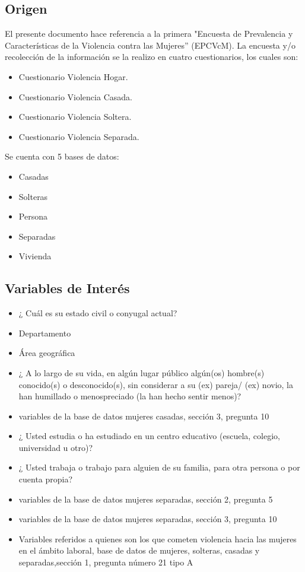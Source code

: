 \documentclass[11pt,letter]{article}
\begin{document}
\subsection{Origen}
El presente documento hace referencia a la primera "Encuesta de Prevalencia y Características de la Violencia contra las Mujeres'' (EPCVcM).
La encuesta y/o recolección de la información se la realizo en cuatro cuestionarios, los cuales son:
\begin{itemize}
\item	Cuestionario Violencia Hogar.
\item   Cuestionario Violencia Casada.
\item   Cuestionario Violencia Soltera.
\item   Cuestionario Violencia Separada.
\end{itemize}
Se cuenta con 5 bases de datos:
\begin{itemize}
\item	Casadas
\item	Solteras
\item	Persona
\item	Separadas
\item	Vivienda
\end{itemize}

\subsection{Variables de Interés}
\begin{itemize}
\item ¿ Cuál es su estado civil o conyugal actual?
\item Departamento
\item Área geográfica
\item ¿ A lo largo de su vida, en algún lugar público algún(os) hombre(s) conocido(s) o desconocido(s), sin considerar a su (ex) pareja/ (ex) novio, la han humillado o menospreciado (la han hecho sentir menos)?
\item variables de la base de datos mujeres casadas, sección 3, pregunta 10
\item ¿ Usted estudia o ha estudiado en un centro educativo (escuela, colegio, universidad u otro)?
\item ¿ Usted trabaja o trabajo para alguien de su familia, para otra persona o por cuenta propia?
\item variables de la base de datos mujeres separadas, sección 2, pregunta 5
\item variables de la base de datos mujeres separadas, sección 3, pregunta 10
\item Variables referidos a quienes son los que cometen violencia hacia las mujeres en el ámbito laboral, base de datos de mujeres, solteras, casadas y separadas,sección 1, pregunta número  21 tipo A
\end{itemize}
\end{document}
